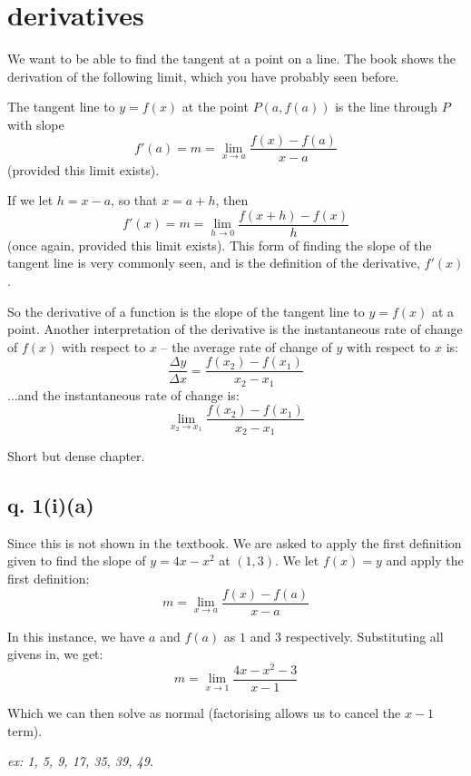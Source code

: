 \documentclass[10pt,a4paper]{report}
\begin{document}

\section{derivatives}

We want to be able to find the tangent at a point on a line. The book shows the derivation of the following limit, which you have probably seen before.

The tangent line to $y = f(x)$ at the point $P(a, f(a))$ is the line through $P$ with slope
$$
	f'(a) = m = \lim_{x \to a} \frac{f(x) - f(a)}{x - a}
$$
(provided this limit exists).

If we let $h = x - a$, so that $x = a + h$, then
$$
	f'(x) = m = \lim_{h \to 0} \frac{f(x + h) - f(x)}{h}
$$
(once again, provided this limit exists). This form of finding the slope of the tangent line is very commonly seen, and is the definition of the derivative, $f'(x)$.

So the derivative of a function is the slope of the tangent line to $y = f(x)$ at a point. Another interpretation of the derivative is the instantaneous rate of change of $f(x)$ with respect to $x$ -- the average rate of change of $y$ with respect to $x$ is:
$$
	\frac{\Delta y}{\Delta x} = \frac{f(x_2) - f(x_1)}{x_2 - x_1}
$$
...and the instantaneous rate of change is:
$$
	\lim_{x_2 \to x_1} \frac{f(x_2) - f(x_1)}{x_2 - x_1}
$$

Short but dense chapter.

\subsection{q. 1(i)(a)}

Since this is not shown in the textbook. We are asked to apply the first definition given to find the slope of $y = 4x -x^2$ at $(1, 3)$. We let $f(x) = y$ and apply the first definition:
$$
	m = \lim_{x \to a} \frac{f(x) - f(a)}{x - a}
$$

In this instance, we have $a$ and $f(a)$ as $1$ and $3$ respectively. Substituting all givens in, we get:
$$
	m = \lim_{x \to 1} \frac{4x - x^2 - 3}{x - 1}
$$

Which we can then solve as normal (factorising allows us to cancel the $x - 1$ term).

\emph{ex: 1, 5, 9, 17, 35, 39, 49.}
\end{document}
